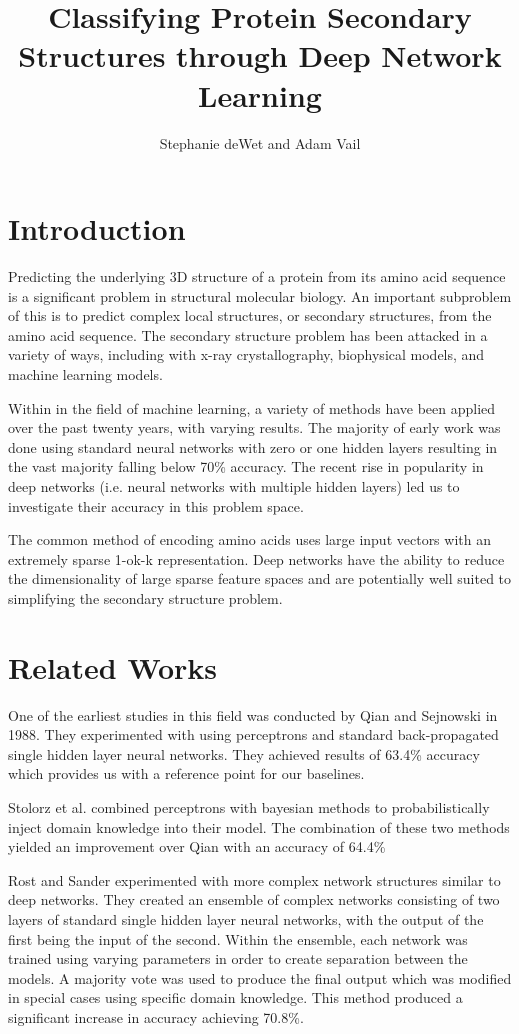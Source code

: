 \documentclass[]{article}
\title{Classifying Protein Secondary Structures through Deep Network Learning}
\author{Stephanie deWet and Adam Vail}
\begin{document}
\maketitle

\section{Introduction}
\label{subsec:intro}
Predicting the underlying 3D structure of a protein from its amino acid sequence is a significant problem in structural molecular biology.
An important subproblem of this is to predict complex local structures, or secondary structures, from the amino acid sequence.  
The secondary structure problem has been attacked in a variety of ways, including with x-ray crystallography, biophysical models, and machine learning models.

Within in the field of machine learning, a variety of methods have been applied  over the past twenty years, with varying results. 
The majority of early work was done using standard neural networks with zero or one hidden layers resulting in the vast majority falling below 70\% accuracy.
The recent rise in popularity in deep networks (i.e. neural networks with multiple hidden layers) led us to investigate their accuracy in this problem space.

The common method of encoding amino acids uses large input vectors with an extremely sparse 1-ok-k representation.
Deep networks have the ability to reduce the dimensionality of large sparse feature spaces and are potentially well suited to simplifying the secondary structure problem.

\section{Related Works}
\label{subsec:relatedworks}
One of the earliest studies in this field was conducted by Qian and Sejnowski \cite{Qian} in 1988.
They experimented with using perceptrons and standard back-propagated single hidden layer neural networks.
They achieved results of 63.4\% accuracy which provides us with a reference point for our baselines.

Stolorz et al. combined perceptrons with bayesian methods to probabilistically inject domain knowledge into their model.
The combination of these two methods yielded an improvement over Qian with an accuracy of 64.4\%

Rost and Sander experimented with more complex network structures similar to deep networks.
They created an ensemble of complex networks consisting of two layers of standard single hidden layer neural networks, with the output of the first being the input of the second.
Within the ensemble, each network was trained using varying parameters in order to create separation between the models.
A majority vote was used to produce the final output which was modified in special cases using specific domain knowledge.
This method produced a significant increase in accuracy achieving 70.8\%.
\end{document}
